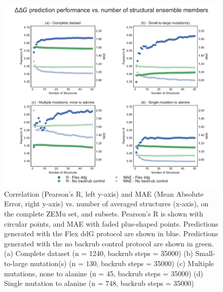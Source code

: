 \begin{figure}
  \includegraphics[width=\textwidth,keepaspectratio]{structs-v-corr-WildTypeComplex-zemu-12-60000-rscript-validated-t14.pdf}
  \caption[]{ %
    Correlation (Pearson's R, left y-axis) and MAE (Mean Absolute Error, right y-axis) vs. number of averaged structures (x-axis), on the complete ZEMu set, and subsets.
    Pearson's R is shown with circular points, and MAE with faded plus-shaped points.
    Predictions generated with the Flex ddG protocol are shown in blue.
    Predictions generated with the no backrub control protocol are shown in green.
    (a) Complete dataset (n = 1240, backrub steps = 35000)
    (b) Small-to-large mutation(s) (n = 130, backrub steps = 35000)
    (c) Multiple mutations, none to alanine (n = 45, backrub steps = 35000)
    (d) Single mutation to alanine (n = 748, backrub steps = 35000)
  } \label{fig:structs-v-corr-WildTypeComplex-zemu-12-60000-rscript-validated-t14}
\end{figure}
